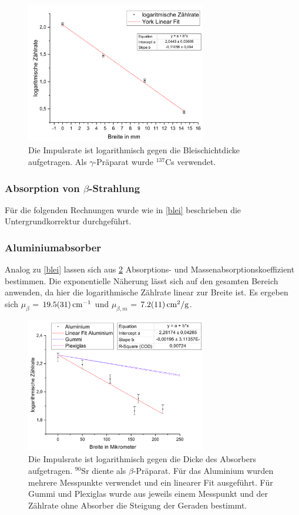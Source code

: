 \documentclass[
	a4paper,
	12pt,
	pagesize,
	ngerman
]{scrartcl}
\begin{document}
	\begin{figure}[H]
		\includegraphics[width=0.7\textwidth]{GammaBlei}
		\centering
		\caption{Die Impulsrate ist logarithmisch gegen die Bleischichtdicke aufgetragen. Als $\gamma$-Präparat wurde $ ^{137}$Cs verwendet.}%
		\label{GammaBlei}
		\centering
	\end{figure}
	
	
	
	\subsubsection{Absorption von $\beta$-Strahlung} 
	Für die folgenden Rechnungen wurde wie in \cref{blei} beschrieben die Untergrundkorrektur durchgeführt.
	\subsubsection*{Aluminiumabsorber}
	
	Analog zu \cref{blei} lassen sich aus \cref{BetaAlu} Absorptions- und Massenabsorptionskoeffizient bestimmen. 
	Die exponentielle Näherung lässt sich auf den gesamten Bereich anwenden, da hier die logarithmische Zählrate linear zur Breite ist.
	Es ergeben sich $\mu_\beta$ = $\SI{19,5 +- 3,1}{cm^{-1}}$ und $\mu_{\beta,m}$ = $\SI{7,2+-1,1}{cm^2/g}$.\cite{dichten}
	\begin{figure}[H]
		\includegraphics[width=0.7\textwidth]{BetaAlu}
		\centering
		\caption{Die Impulsrate ist logarithmisch gegen die Dicke des Absorbers aufgetragen. $ ^{90}$Sr diente als $\beta$-Präparat. Für das Aluminium wurden mehrere Messpunkte verwendet und ein linearer Fit ausgeführt. Für Gummi und Plexiglas wurde aus jeweils einem Messpunkt und der Zählrate ohne Absorber die Steigung der Geraden bestimmt.}
		\label{BetaAlu}
		\centering
	\end{figure}
\end{document}
